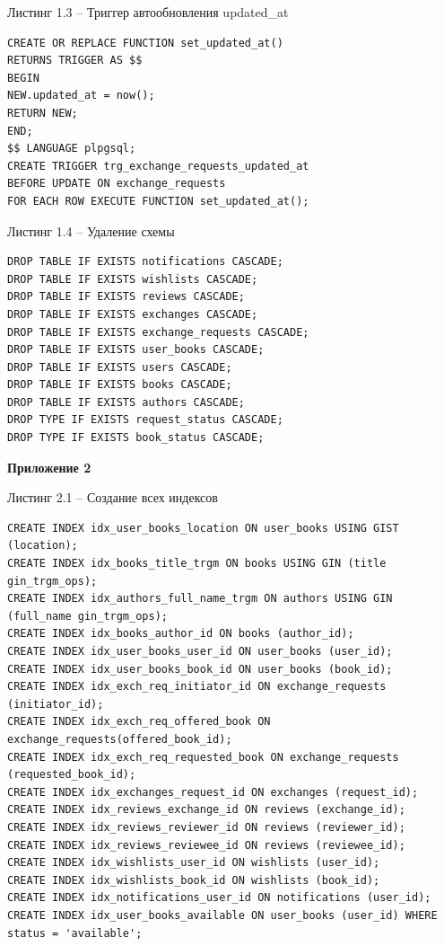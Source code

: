 \documentclass[14pt,a4paper]{extarticle}
\begin{document}
\begin{center}
Листинг 1.3 -- Триггер автообновления updated\_at
\end{center}
\begin{lstlisting}
CREATE OR REPLACE FUNCTION set_updated_at()
RETURNS TRIGGER AS $$
BEGIN
NEW.updated_at = now();
RETURN NEW;
END;
$$ LANGUAGE plpgsql;
CREATE TRIGGER trg_exchange_requests_updated_at
BEFORE UPDATE ON exchange_requests
FOR EACH ROW EXECUTE FUNCTION set_updated_at();
\end{lstlisting}

\begin{center}
Листинг 1.4 -- Удаление схемы
\end{center}
\begin{lstlisting}
DROP TABLE IF EXISTS notifications CASCADE;
DROP TABLE IF EXISTS wishlists CASCADE;
DROP TABLE IF EXISTS reviews CASCADE;
DROP TABLE IF EXISTS exchanges CASCADE;
DROP TABLE IF EXISTS exchange_requests CASCADE;
DROP TABLE IF EXISTS user_books CASCADE;
DROP TABLE IF EXISTS users CASCADE;
DROP TABLE IF EXISTS books CASCADE;
DROP TABLE IF EXISTS authors CASCADE;
DROP TYPE IF EXISTS request_status CASCADE;
DROP TYPE IF EXISTS book_status CASCADE;
\end{lstlisting}

\bigskip
\textbf{Приложение 2}

\begin{center}
Листинг 2.1 -- Создание всех индексов
\end{center}
\begin{lstlisting}
CREATE INDEX idx_user_books_location ON user_books USING GIST (location);
CREATE INDEX idx_books_title_trgm ON books USING GIN (title gin_trgm_ops);
CREATE INDEX idx_authors_full_name_trgm ON authors USING GIN (full_name gin_trgm_ops);
CREATE INDEX idx_books_author_id ON books (author_id);
CREATE INDEX idx_user_books_user_id ON user_books (user_id);
CREATE INDEX idx_user_books_book_id ON user_books (book_id);
CREATE INDEX idx_exch_req_initiator_id ON exchange_requests (initiator_id);
CREATE INDEX idx_exch_req_offered_book ON exchange_requests(offered_book_id);
CREATE INDEX idx_exch_req_requested_book ON exchange_requests (requested_book_id);
CREATE INDEX idx_exchanges_request_id ON exchanges (request_id);
CREATE INDEX idx_reviews_exchange_id ON reviews (exchange_id);
CREATE INDEX idx_reviews_reviewer_id ON reviews (reviewer_id);
CREATE INDEX idx_reviews_reviewee_id ON reviews (reviewee_id);
CREATE INDEX idx_wishlists_user_id ON wishlists (user_id);
CREATE INDEX idx_wishlists_book_id ON wishlists (book_id);
CREATE INDEX idx_notifications_user_id ON notifications (user_id);
CREATE INDEX idx_user_books_available ON user_books (user_id) WHERE status = 'available';
\end{lstlisting}
\end{document}
